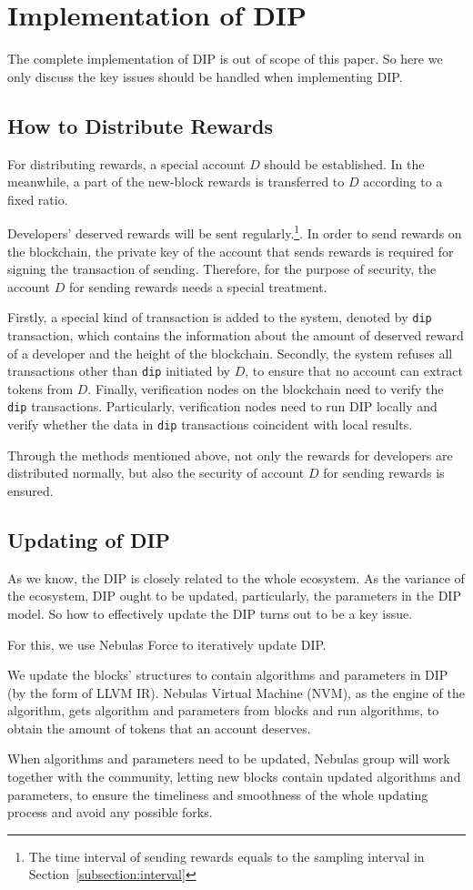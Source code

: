 \section{Implementation of DIP}

\noindent
The complete implementation of DIP is out of scope of this paper. So here we only discuss the key issues should be handled when implementing DIP\@.

\subsection{How to Distribute Rewards}
\noindent
For distributing rewards, a special account $D$ should be established. In the meanwhile, a part of the new-block rewards is transferred to $D$ according to a fixed ratio.


Developers' deserved rewards will be sent regularly.\footnote{The time interval of sending rewards equals to the sampling interval in Section~\ref{subsection:interval}}. In order to send rewards on the blockchain, the private key of the account that sends rewards is required for signing the transaction of sending. Therefore, for the purpose of security, the account $D$ for sending rewards needs a special treatment.

Firstly, a special kind of transaction is added to the system, denoted by \texttt{dip} transaction, which contains the information about the amount of deserved reward of a developer and the height of the blockchain. Secondly, the system refuses all transactions other than \texttt{dip} initiated by $D$, to ensure that no account can extract tokens from $D$. Finally, verification nodes on the blockchain  need to verify the \texttt{dip} transactions. Particularly, verification nodes need to run DIP locally and verify whether the data in \texttt{dip} transactions coincident with local results.

Through the methods mentioned above, not only the rewards for developers are distributed normally, but also the security of account $D$ for sending rewards is ensured.

\subsection{Updating of DIP}
\noindent
As we know, the DIP is closely related to the whole ecosystem. As the variance
of the ecosystem, DIP ought to be updated, particularly, the parameters in the
DIP model. So how to effectively update the DIP turns out to be a key issue.

For this, we use Nebulas Force to iteratively update DIP\@.

We update the blocks' structures to contain algorithms and parameters in DIP (by the form of LLVM IR). Nebulas Virtual Machine (NVM), as the engine of the algorithm, gets algorithm and parameters from blocks and run algorithms, to obtain the amount of tokens that an account deserves.

When algorithms and parameters need to be updated, Nebulas group will work
together with the community, letting new blocks contain updated algorithms and parameters, to ensure the timeliness and smoothness of the whole updating process and avoid any possible forks.
